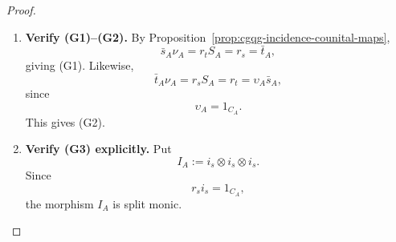\documentclass[oneside]{article}
\newcommand{\WH}{\mathsf{WH}}
\newcommand{\Sp}{\mathbf{Sp}}
\newcommand{\Kar}{\operatorname{Kar}}
\theoremstyle{plain}
\theoremstyle{definition}
\theoremstyle{remark}
\begin{document}
\begin{proof}
\begin{enumerate}[beginpenalty=10000]
        Transport the target object through
        \[
            C_A
            \xrightarrow{i_s}
            \bigl(
                \WH_{\mathrm{sp}}(A),
                t_A^{\mathrm{PS}}
            \bigr)
            \xrightarrow{r_s}
            C_A
        \]
        and the composition object through \(j_A,p_A\). Since the transported base-valued source and target maps are
        \[
            \bar s_A=r_t,
            \qquad
            \bar t_A=r_s,
        \]
        and the transported boundary coactions are \(\gamma_l,\gamma_r\), the conjugate of \(\varsigma_{\mathrm{PS}}\) is precisely
        \[
            \varsigma_A
            =
            (\bar s_A\otimes1_{C_A}\otimes\bar t_A)
            (\gamma_r\otimes1)
            j_A.
        \]
        Because \(j_A\) is the cotensor equalizer,
        \[
            (\gamma_r\otimes1)j_A
            =
            (1\otimes\gamma_l)j_A,
        \]
        which also gives
        \[
            \varsigma_A
            =
            (\bar s_A\otimes1_{C_A}\otimes\bar t_A)
            (1\otimes\gamma_l)
            j_A.
        \]

        Equivalently, in \(\Kar(\Sp)\),
        \begin{equation}
            \varsigma_{\mathrm{PS}}j_A
            =
            (i_s\otimes i_s\otimes i_s)\varsigma_A.
            \label{eq:cgqg-varsigma-transport-intertwining}
        \end{equation}
        Indeed, the left-hand side lands in the tensor cube of the target retract, while
        \[
            i_sr_s=t_A^{\mathrm{PS}}.
        \]

        \item \textbf{Verify \textup{(G1)--(G2)}.} By Proposition~\ref{prop:cgqg-incidence-counital-maps},
        \[
            \bar s_A\nu_A
            =
            r_tS_A
            =
            r_s
            =
            \bar t_A,
        \]
        giving \textup{(G1)}. Likewise,
        \[
            \bar t_A\nu_A
            =
            r_sS_A
            =
            r_t
            =
            \upsilon_A\bar s_A,
        \]
        since
        \[
            \upsilon_A=1_{C_A}.
        \]
        This gives \textup{(G2)}.

        \item \textbf{Verify \textup{(G3)} explicitly.} Put
        \[
            I_A:=i_s\otimes i_s\otimes i_s.
        \]
        Since
        \[
            r_si_s=1_{C_A},
        \]
        the morphism \(I_A\) is split monic.


\end{enumerate}
\end{proof}
\end{document}
